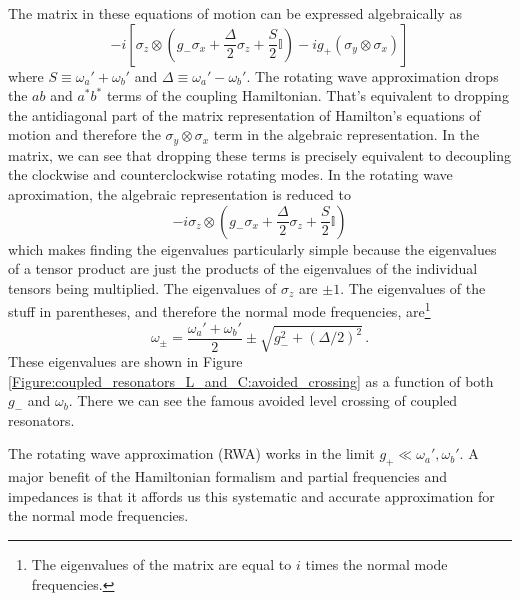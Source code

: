 \documentclass{article}
\begin{document}
The matrix in these equations of motion can be expressed algebraically as
\begin{equation}
  -i \left[
    \sigma_z \otimes
      \left(
        g_- \sigma_x + \frac{\Delta}{2} \sigma_z + \frac{S}{2} \mathbb{I}
      \right)
    -i g_+ (\sigma_y \otimes \sigma_x)
  \right]
\end{equation}
where $S \equiv \omega_a' + \omega_b'$ and $\Delta \equiv \omega_a' - \omega_b'$.
The rotating wave approximation drops the $ab$ and $a^* b^*$ terms of the coupling Hamiltonian.
That's equivalent to dropping the antidiagonal part of the matrix representation of Hamilton's equations of motion and therefore the $\sigma_y \otimes \sigma_x$ term in the algebraic representation.
In the matrix, we can see that dropping these terms is precisely equivalent to decoupling the clockwise and counterclockwise rotating modes.
In the rotating wave aproximation, the algebraic representation is reduced to
\begin{equation*}
  -i \sigma_z \otimes \left(
    g_- \sigma_x + \frac{\Delta}{2} \sigma_z + \frac{S}{2} \mathbb{I}
  \right)
\end{equation*}
which makes finding the eigenvalues particularly simple because the eigenvalues of a tensor product are just the products of the eigenvalues of the individual tensors being multiplied.
The eigenvalues of $\sigma_z$ are $\pm 1$.
The eigenvalues of the stuff in parentheses, and therefore the normal mode frequencies, are\footnote{The eigenvalues of the matrix are equal to $i$ times the normal mode frequencies.}
\begin{equation}
  \omega_\pm
  = \frac{\omega_a' + \omega_b'}{2} \pm \sqrt{g_-^2 + (\Delta / 2)^2 } \, .
\end{equation}
These eigenvalues are shown in Figure \ref{Figure:coupled_resonators_L_and_C:avoided_crossing} as a function of both $g_-$ and $\omega_b$.
There we can see the famous avoided level crossing of coupled resonators.

The rotating wave approximation (RWA) works in the limit $g_+ \ll \omega_a', \omega_b'$.
A major benefit of the Hamiltonian formalism and partial frequencies and impedances is that it affords us this systematic and accurate approximation for the normal mode frequencies.
\end{document}
